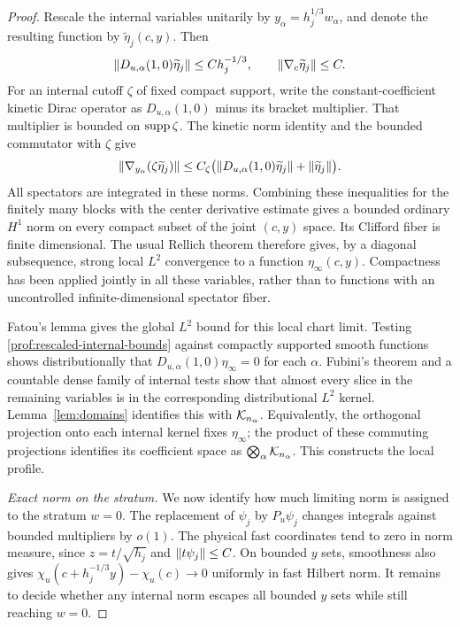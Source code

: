 \begin{proof}
Rescale the internal variables unitarily by \(y_\alpha=h_j^{1/3}w_\alpha\),
and denote the resulting function by \(\widetilde\eta_j(c,y)\). Then
\begin{equation}\label{prof:rescaled-internal-bounds}
 \left\lVert D_{u,\alpha}(1,0)\widetilde\eta_j\right\rVert\le Ch_j^{-1/3},
 \qquad \left\lVert \nabla_c\widetilde\eta_j\right\rVert\le C.
\end{equation}
For an internal cutoff \(\zeta\) of fixed compact support, write the
constant-coefficient kinetic Dirac operator as
\(D_{u,\alpha}(1,0)\) minus its bracket multiplier. That multiplier is
bounded on \(\operatorname{supp}\zeta\). The kinetic norm identity and the bounded
commutator with \(\zeta\) give
\[
 \left\lVert \nabla_{y_\alpha}(\zeta\widetilde\eta_j)\right\rVert
 \le C_\zeta\bigl(\left\lVert D_{u,\alpha}(1,0)\widetilde\eta_j\right\rVert
                          +\left\lVert \widetilde\eta_j\right\rVert\bigr).
\]
All spectators are integrated in these norms. Combining these inequalities
for the finitely many blocks with the center derivative estimate gives a
bounded ordinary \(H^1\) norm on every compact subset of the joint
\((c,y)\) space. Its Clifford fiber is finite dimensional. The usual
Rellich theorem therefore gives, by a diagonal subsequence, strong local
\(L^2\) convergence to a function \(\eta_\infty(c,y)\). Compactness has
been applied jointly in all these variables, rather than to functions
with an uncontrolled infinite-dimensional spectator fiber.

Fatou's lemma gives the global \(L^2\) bound for this local chart limit.
Testing \eqref{prof:rescaled-internal-bounds} against compactly supported
smooth functions shows distributionally that
\(D_{u,\alpha}(1,0)\eta_\infty=0\) for each \(\alpha\). Fubini's theorem
and a countable dense family of internal tests show that almost every
slice in the remaining variables is in the corresponding distributional
\(L^2\) kernel. Lemma~\ref{lem:domains} identifies this with
\(\mathcal K_{n_\alpha}\). Equivalently, the orthogonal projection onto each
internal kernel fixes \(\eta_\infty\); the product of these commuting
projections identifies its coefficient space as
\(\bigotimes_\alpha\mathcal K_{n_\alpha}\). This constructs the local profile.

\smallskip\noindent\emph{Exact norm on the stratum.}
We now identify how much limiting norm is assigned to the stratum
\(w=0\). The replacement of \(\psi_j\) by \(P_u\psi_j\) changes integrals against
bounded multipliers by \(o(1)\). The physical fast coordinates tend to zero
in norm measure, since \(z=t/\sqrt{h_j}\) and
\(\left\lVert t\psi_j\right\rVert\le C\). On bounded \(y\) sets, smoothness also gives
\(\chi_u(c+h_j^{-1/3}y)-\chi_u(c)\to0\) uniformly in fast Hilbert norm.
It remains to decide whether any internal norm escapes all bounded
\(y\) sets while still reaching \(w=0\).


\end{proof}
